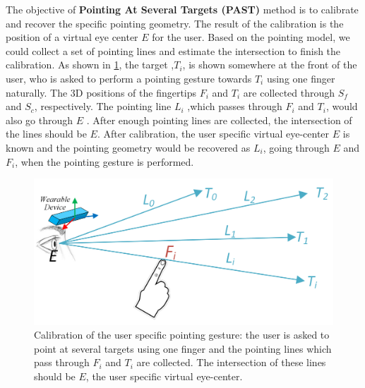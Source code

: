 The objective of \textbf{Pointing At Several Targets (PAST)} method is to calibrate and recover the specific pointing geometry. The result of the calibration is the position of a virtual eye center $E$ for the user. Based on the pointing model, we could collect a set of pointing lines and estimate the intersection to finish the calibration.
As shown in \figurename{ \ref{fig:3-PAST:PSATCalibration}}, the target ,$T_i$, is shown somewhere at the front of the user, who is asked to perform a pointing gesture towards $T_i$ using one finger naturally. The 3D positions of the fingertips $F_i$ and $T_i$ are collected through $S_f$ and $S_c$, respectively. The pointing line $L_i$ ,which passes through $F_i$ and $T_i$, would also go through $E$ . After enough pointing lines are collected, the intersection of the lines should be $E$. After calibration, the user specific virtual eye-center $E$ is known and the pointing geometry would be recovered as $L_{i}$, going through $E$ and  $F_i$, when the pointing gesture is performed.
\begin{figure} [htb]
	\centering
	\includegraphics[width= \linewidth]{figures/3-PAST/Calibration.png}
	\caption{Calibration of the user specific pointing gesture: the user is asked to point at several targets using one finger and the pointing lines which pass through $F_i$ and $T_i$ are collected. The intersection of these lines should be $E$, the user specific virtual eye-center.}
	\label{fig:3-PAST:PSATCalibration}
\end{figure}


